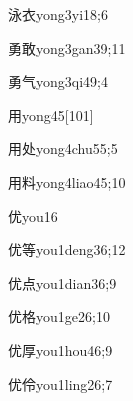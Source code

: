 \begin{verbete}{泳衣}{yong3yi1}{8;6}
\end{verbete}

\begin{verbete}{勇敢}{yong3gan3}{9;11}
\end{verbete}

\begin{verbete}{勇气}{yong3qi4}{9;4}
\end{verbete}

\begin{verbete}{用}{yong4}{5}[101]
\end{verbete}

\begin{verbete}{用处}{yong4chu5}{5;5}
\end{verbete}

\begin{verbete}{用料}{yong4liao4}{5;10}
\end{verbete}

\begin{verbete}{优}{you1}{6}
\end{verbete}

\begin{verbete}{优等}{you1deng3}{6;12}
\end{verbete}

\begin{verbete}{优点}{you1dian3}{6;9}
\end{verbete}

\begin{verbete}{优格}{you1ge2}{6;10}
\end{verbete}

\begin{verbete}{优厚}{you1hou4}{6;9}
\end{verbete}

\begin{verbete}{优伶}{you1ling2}{6;7}
\end{verbete}

